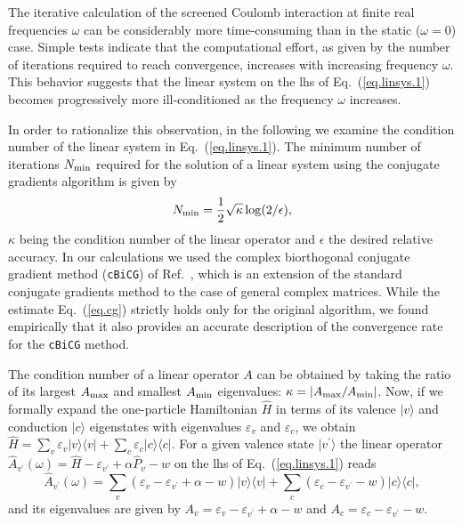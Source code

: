 \documentclass[twocolumn,prb,showpacs,superscriptaddress]{revtex4}
\def\w{\omega}
\def\>{\rangle}
\def\<{\langle}
\def\H{\hat{H}}
\def\E{\varepsilon}
\def\vp{{v^\prime}}
\begin{document}
The iterative calculation of the screened Coulomb interaction at finite real
frequencies $\w$ can be considerably more time-consuming than in the static
($\w=0$) case. Simple tests indicate that the computational effort, as given
by the number of iterations required to reach convergence, increases with 
increasing frequency $\w$. This behavior suggests that the linear system 
on the lhs of Eq.\ (\ref{eq.linsys.1}) becomes progressively more ill-conditioned 
as the frequency $\w$ increases.

In order to rationalize this observation, in the following we examine
the condition number of the linear system in Eq.\ (\ref{eq.linsys.1}).
The minimum number of iterations $N_{\rm min}$ required for the solution of
a linear system using the conjugate gradients algorithm is given by
  \begin{equation}\label{eq.cg}
  N_{\rm min} = \frac{1}{2}\sqrt{\kappa} \log(2/\epsilon),
  \end{equation}
$\kappa$ being the condition number of the linear operator and $\epsilon$ the
desired relative accuracy.\cite{painless.cg} In our calculations we used the 
complex biorthogonal conjugate gradient method ({\tt cBiCG}) of Ref.\ ,
which is an extension of the standard conjugate gradients method to the 
case of general complex matrices. While the estimate Eq.\ (\ref{eq.cg}) strictly 
holds only for the original algorithm, we found empirically that it also 
provides an accurate description of the convergence rate for the {\tt cBiCG} 
method.

The condition number of a linear operator $A$ can be obtained by taking the ratio 
of its largest $A_{\rm max}$ and smallest $A_{\rm min}$ eigenvalues: 
$\kappa=|A_{\rm max}/A_{\rm min}|$.
Now, if we formally expand the one-particle Hamiltonian $\H$ in terms of its valence 
$|v\>$ and conduction $|c\>$ eigenstates with eigenvalues $\E_v$ and $\E_c$, we obtain
$\H = \sum_v \E_v |v\>\<v| + \sum_c \E_c |c\>\<c|$. For a given valence state 
$|v^\prime\>$ the linear operator $\hat{A}_\vp (\w) = \H - \E_\vp + \alpha \hat{P}_v - w$ 
on the lhs of Eq.\ (\ref{eq.linsys.1}) reads
  \begin{equation}
  \hat{A}_\vp (\w)  = 
  \sum_v ( \E_v - \E_\vp + \alpha - w ) |v\>\<v| 
  + \sum_c ( \E_c - \E_\vp - w ) |c\>\<c|,
  \end{equation}
and its eigenvalues are given by $A_v = \E_v - \E_\vp + \alpha - w$ and
$A_c = \E_c - \E_\vp - w$. 
\end{document}
